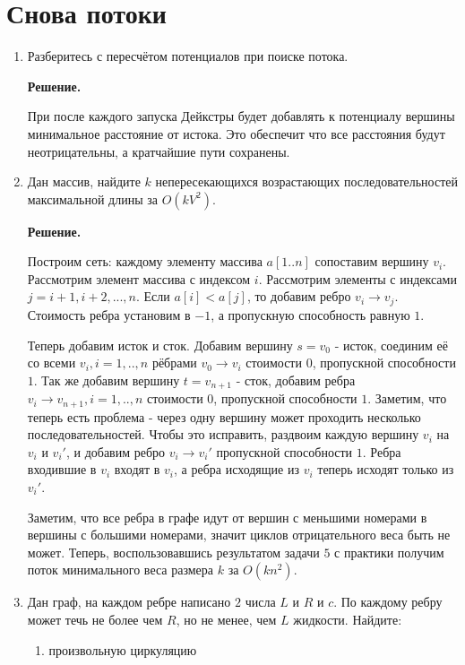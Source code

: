 \section*{Снова потоки}
\begin{enumerate}
	\item Разберитесь с пересчётом потенциалов при поиске потока.
	
	\textbf{Решение.}
	
	При после каждого запуска Дейкстры будет добавлять к потенциалу вершины минимальное расстояние от истока. Это 
	обеспечит что все расстояния будут неотрицательны, а кратчайшие пути сохранены.
	
	\item Дан массив, найдите $k$ непересекающихся возрастающих последовательностей максимальной длины за $O(kV^2)$.
	
	\textbf{Решение.}
	
	Построим сеть: каждому элементу массива $a[1..n]$ сопоставим вершину $v_i$. Рассмотрим элемент массива с 
	индексом $i$. Рассмотрим элементы с индексами $j = i + 1, i + 2, ..., n$. Если $a[i] < a[j]$, то добавим ребро 
	$v_i \to v_j$. Стоимость ребра установим в $-1$, а пропускную способность равную $1$. 
	
	Теперь добавим исток и сток. Добавим вершину $s = v_0$ - исток, соединим её со всеми $v_i, i = 1,..,n$ рёбрами 
	$v_0 \to v_i$ стоимости 0, пропускной способности $1$. Так же добавим вершину $t = v_{n + 1}$ - сток, добавим 
	ребра $v_i \to v_{n + 1}, i = 1,..,n$ стоимости $0$, пропускной способности $1$. Заметим, что теперь есть 
	проблема - через одну вершину может проходить несколько последовательностей. Чтобы это исправить, раздвоим 
	каждую вершину $v_i$ на $v_i$ и $v_i'$, и добавим ребро $v_i \to v_i'$ пропускной способности $1$. Ребра 
	входившие в $v_i$ входят в $v_i$, а ребра исходящие из $v_i$ теперь исходят только из $v_i'$.  
	
	Заметим, что все ребра в графе идут от вершин с меньшими номерами в вершины с большими номерами, значит циклов 
	отрицательного веса быть не может. Теперь, воспользовавшись результатом задачи $5$ с практики получим поток 
	минимального веса размера $k$ за $O(kn^2)$.

	
	\item Дан граф, на каждом ребре написано $2$ числа $L$ и $R$ и $c$. По каждому ребру может течь не более
	чем $R$, но не менее, чем $L$ жидкости. Найдите:
	\begin{enumerate}
		\item произвольную циркуляцию
		

\end{enumerate}
\end{enumerate}
